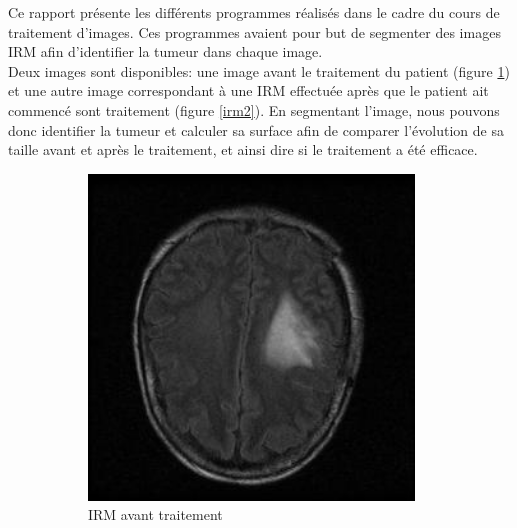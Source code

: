 Ce rapport présente les différents programmes réalisés dans le cadre du cours de traitement d'images. Ces programmes avaient pour but de segmenter des images IRM afin d'identifier la tumeur dans chaque image.\\

Deux images sont disponibles: une image avant le traitement du patient (figure \ref{irm1}) et une autre image correspondant à une IRM effectuée après que le patient ait commencé sont traitement (figure \ref{irm2}). En segmentant l'image, nous pouvons donc identifier la tumeur et calculer sa surface afin de comparer l'évolution de sa taille avant et après le traitement, et ainsi dire si le traitement a été efficace.\\

\begin{figure}[t!]
    \centering
    \begin{subfigure}[b]{0.5\textwidth}
        \centering
        \includegraphics[width=0.95\textwidth]{images/IRMcoupe17-t1.jpg}
	\caption{IRM avant traitement}\label{irm1}
    \end{subfigure}%
    ~ 
    \begin{subfigure}[b]{0.5\textwidth}
        \centering

\end{subfigure}
\end{figure}
